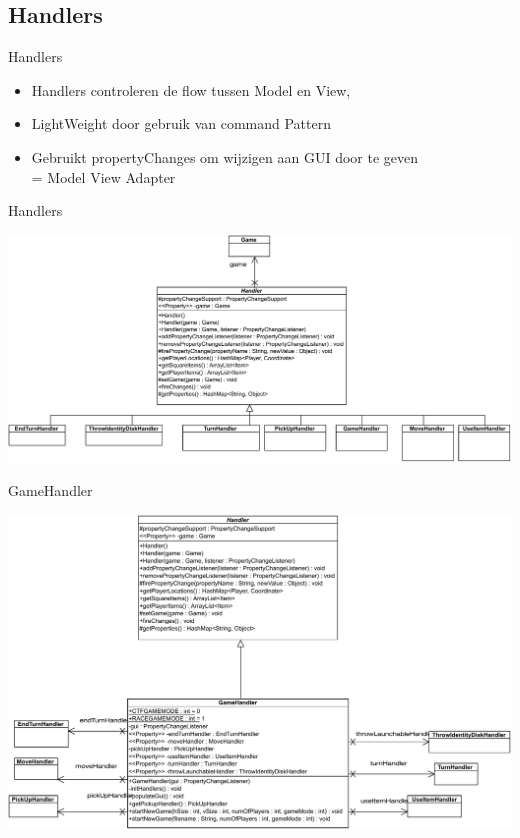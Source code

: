 \documentclass[11pt,t]{beamer}
\begin{document}
\subsection{Handlers}

\begin{frame}{Handlers}
\begin{itemize}
\item Handlers controleren de flow tussen Model en View,
\item LightWeight door gebruik van command Pattern
\item Gebruikt propertyChanges om wijzigen aan GUI door te geven \\
= Model View Adapter
\end{itemize}
\end{frame}

\begin{frame}{Handlers}
\begin{center}
\includegraphics[width=0.95\linewidth]{images/handlers}
\end{center}
\end{frame}

\begin{frame}{GameHandler}
\begin{center}
\includegraphics[scale=0.3]{images/gamehandler}
\end{center}
\end{frame}
\end{document}
